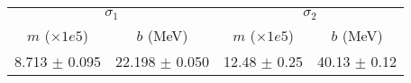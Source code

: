 \begin{tabular}{cc|cc}
\multicolumn{2}{c|}{$\sigma_1$} & \multicolumn{2}{|c}{$\sigma_2$} \\
$m$ ($\times1e5$) & $b$ (MeV) & $m$ ($\times1e5$) & $b$ (MeV) \\
\hline
8.713 $\pm$ 0.095 & 22.198 $\pm$ 0.050 & 12.48 $\pm$ 0.25 & 40.13 $\pm$ 0.12\\
\end{tabular}
